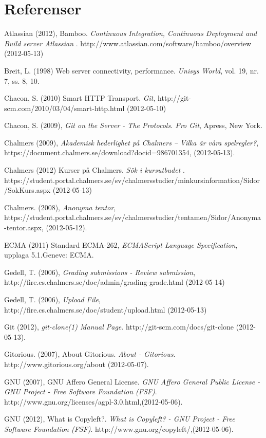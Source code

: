 
\renewcommand{\thechapter}{}
\chapter{Referenser}
\begin{flushleft}
\small
Atlassian (2012), Bamboo. \emph{Continuous Integration, Continuous Deployment and Build server Atlassian  }. http://www.atlassian.com/software/bamboo/overview (2012-05-13)

Breit, L. (1998) Web server connectivity, performance. \emph{Unisys World}, vol. 19, nr. 7, ss. 8, 10.

Chacon, S. (2010) Smart HTTP Transport. \emph{Git}, http://git-scm.com/2010/03/04/smart-http.html (2012-05-10)

Chacon, S. (2009), \emph{Git on the Server - The Protocols. Pro Git}, Apress, New York.

Chalmers (2009), \emph{Akademisk hederlighet på Chalmers – Vilka är våra spelregler?}, https://document.chalmers.se/download?docid=986701354, (2012-05-13).

Chalmers (2012) Kurser på Chalmers. \emph{Sök i kursutbudet} . https://student.portal.chalmers.se/sv/chalmersstudier/minkursinformation/Sidor/SokKurs.aspx (2012-05-13)

Chalmers. (2008), \emph{Anonyma tentor}, https://student.portal.chalmers.se/sv/chalmersstudier/tentamen/Sidor/Anonyma-tentor.aspx, (2012-05-12).

ECMA (2011) Standard ECMA-262, \emph{ECMAScript Language Specification}, upplaga 5.1.Geneve: ECMA.

Gedell, T. (2006), \emph{Grading submissions - Review submission}, http://fire.cs.chalmers.se/doc/admin/grading-grade.html (2012-05-14)

Gedell, T. (2006), \emph{Upload File}, http://fire.cs.chalmers.se/doc/student/upload.html (2012-05-13)

Git (2012), \emph{git-clone(1) Manual Page}. http://git-scm.com/docs/git-clone (2012-05-13).

Gitorious. (2007), About Gitorious. \emph{ About - Gitorious}. http://www.gitorious.org/about (2012-05-07).

GNU (2007), GNU Affero General License. \emph{GNU Affero General Public License - GNU Project - Free Software Foundation (FSF)}. http://www.gnu.org/licenses/agpl-3.0.html,(2012-05-06).

GNU (2012), What is Copyleft?. \emph{What is Copyleft? - GNU Project - Free Software Foundation (FSF)}. http://www.gnu.org/copyleft/,(2012-05-06).


\end{flushleft}
